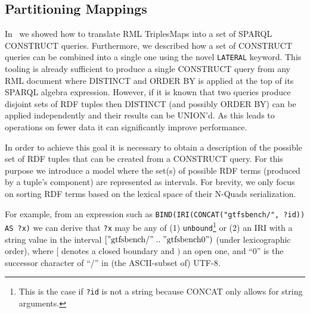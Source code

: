 
\subsection{Partitioning Mappings}
In~ we showed how to translate RML TriplesMaps into a set of SPARQL CONSTRUCT queries. Furthermore, we described how a set of CONSTRUCT queries can be combined into a single one using the novel \texttt{LATERAL} keyword.
This tooling is already sufficient to produce a single CONSTRUCT query from any RML document where DISTINCT and ORDER BY is applied at the top of its SPARQL algebra expression.
However, if it is known that two queries produce disjoint sets of RDF tuples then DISTINCT (and possibly ORDER BY) can be applied independently and their results can be UNION'd. As this leads to operations on fewer data it can significantly improve performance.

In order to achieve this goal it is necessary to obtain a description of the possible set of RDF tuples that can be created from a CONSTRUCT query.
For this purpose we introduce a  model where the set(s) of possible RDF terms (produced by a tuple's component) are represented as intervals.
For brevity, we only focus on sorting RDF terms based on the lexical space of their N-Quads serialization.

For example, from an expression such as \lstinline{BIND(IRI(CONCAT("gtfsbench/", ?id)) AS ?x)} we can derive that \texttt{?x} may be any of (1) \texttt{unbound}\footnote{This is the case if \texttt{?id} is not a string because CONCAT only allows for string arguments.} or (2) an IRI with a string value in the interval $[\mathrm{"gtfsbench/"}\; .. \; \mathrm{"gtfsbench0")}$ (under lexicographic order), where $[$ denotes a closed boundary and $)$ an open one, and ``0'' is the successor character of ``/'' in (the ASCII-subset of) UTF-8.

